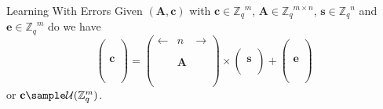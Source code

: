 \documentclass[10pt,compress]{beamer}
\renewcommand{\vec}[1]{\mathbf{#1}\xspace}
\newcommand{\Zq}{\ensuremath{\Z_q}\xspace}
\newcommand{\Udist}[1]{\ensuremath{\mathcal{U}(#1)\xspace}}
\renewcommand{\vec}[1]{\mathbf{#1}\xspace}
\newcommand{\Z}{\ensuremath{\mathbb{Z}}\xspace}
\begin{document}
\begin{frame}{Learning With Errors}
  Given $(\vec{A},\vec{c})$ with $\vec{c} \in \Zq^{m}$, $\vec{A} \in \Zq^{m \times n}$, $\vec{s} \in \Zq^{n}$ and $\vec{e} \in \Zq^{m}$ do we have
  \[
    \left(\begin{array}{c}
            \\
            \\
            \\ 
            \vec{c} \\
            \\
            \\
            \\\end{array} 
        \right) = 
        \left(\begin{array}{ccc}
                \leftarrow & n & \rightarrow \\
                \\
                \\ 
                           & \vec{A} & \\
                \\
                \\
                \\
              \end{array} \right) 
            \times{}
            \left(\begin{array}{c}
                    \\ 
                    \vec{s} \\
                    \\
                  \end{array}\right) 
                + \left(\begin{array}{c}
                          \\
                          \\
                          \\ 
                          \vec{e} \\
                          \\
                          \\
                          \\
                        \end{array}\right)
  \]
  or $\vec{c} \sample \Udist{\Zq^{m}}$.
\end{frame}
\end{document}

